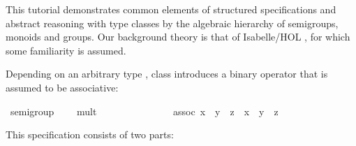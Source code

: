 \begin{isabellebody}
\begin{isamarkuptext}
  This tutorial demonstrates common elements of structured
  specifications and abstract reasoning with type classes by the
  algebraic hierarchy of semigroups, monoids and groups.  Our
  background theory is that of Isabelle/HOL \cite{isa-tutorial}, for
  which some familiarity is assumed.%
\end{isamarkuptext}%
\isamarkuptrue%
%
\isamarkuptrue%
%
\isamarkuptrue%
%
\begin{isamarkuptext}%
Depending on an arbitrary type , class  introduces a binary operator  that is
  assumed to be associative:%
\end{isamarkuptext}%
\isamarkuptrue%
%
\isadelimquote
%
\endisadelimquote
%
\isatagquote
{}\isamarkupfalse%
\ semigroup\ {}\isanewline
\ \ \ mult\ {}{}\ {}{}\ {}\ {}\ {}\ {}{}\ \ \ \ {}\ {}{}{}\ {}{}{}\isanewline
\ \ \ assoc{}\ {}{}x\ {}\ y{}\ {}\ z\ {}\ x\ {}\ {}y\ {}\ z{}{}%
\endisatagquote
{\isafoldquote}%
%
\isadelimquote
%
\endisadelimquote
%
\begin{isamarkuptext}%
\noindent This \hyperlink{command.class}{\mbox{}} specification consists of two parts:

\end{isamarkuptext}
\end{isabellebody}
